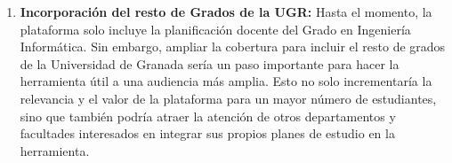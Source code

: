 \begin{enumerate}
    \item \textbf{Incorporación del resto de Grados de la UGR:} Hasta el momento, la plataforma solo incluye la planificación docente del Grado en Ingeniería Informática. Sin embargo, ampliar la cobertura para incluir el resto de grados de la Universidad de Granada sería un paso importante para hacer la herramienta útil a una audiencia más amplia. Esto no solo incrementaría la relevancia y el valor de la plataforma para un mayor número de estudiantes, sino que también podría atraer la atención de otros departamentos y facultades interesados en integrar sus propios planes de estudio en la herramienta.
    
\end{enumerate}
